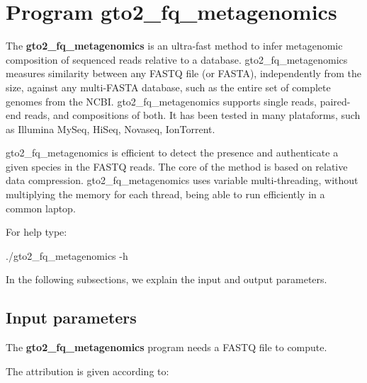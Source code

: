 \documentclass[11pt,]{krantz}
\newenvironment{Shaded}{\begin{snugshade}}{\end{snugshade}}
\newcommand{\ExtensionTok}[1]{#1}
\newcommand{\NormalTok}[1]{#1}
\begin{document}
\section{Program
gto2\_fq\_metagenomics}\label{program-gto2_fq_metagenomics}

The \textbf{gto2\_fq\_metagenomics} is an ultra-fast method to infer
metagenomic composition of sequenced reads relative to a database.
gto2\_fq\_metagenomics measures similarity between any FASTQ file (or
FASTA), independently from the size, against any multi-FASTA database,
such as the entire set of complete genomes from the NCBI.
gto2\_fq\_metagenomics supports single reads, paired-end reads, and
compositions of both. It has been tested in many plataforms, such as
Illumina MySeq, HiSeq, Novaseq, IonTorrent.

gto2\_fq\_metagenomics is efficient to detect the presence and
authenticate a given species in the FASTQ reads. The core of the method
is based on relative data compression. gto2\_fq\_metagenomics uses
variable multi-threading, without multiplying the memory for each
thread, being able to run efficiently in a common laptop.

For help type:

\begin{Shaded}
\begin{Highlighting}[]
\ExtensionTok{./gto2_fq_metagenomics}\NormalTok{ -h}
\end{Highlighting}
\end{Shaded}

In the following subsections, we explain the input and output
parameters.

\subsection*{Input parameters}\label{input-parameters-26}


The \textbf{gto2\_fq\_metagenomics} program needs a FASTQ file to
compute.

The attribution is given according to:
\end{document}
